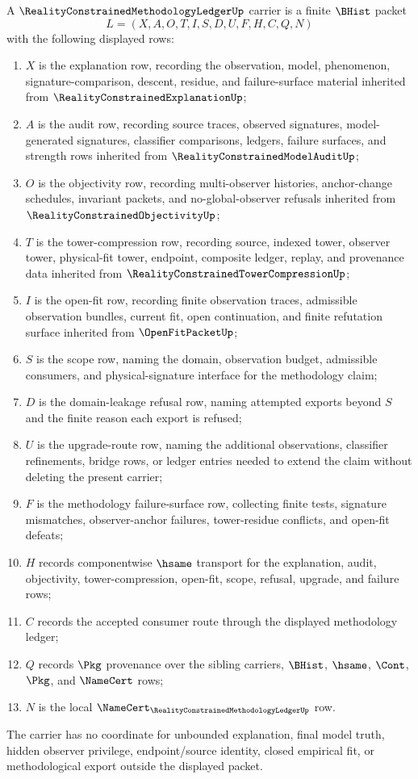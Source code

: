 \begin{definition}
\label{def:reality-constrained-methodology-ledger-carrier}
A $\RealityConstrainedMethodologyLedgerUp$ carrier is a finite $\BHist$ packet
$$
L=(X,A,O,T,I,S,D,U,F,H,C,Q,N)
$$
with the following displayed rows:
\begin{enumerate}
\item $X$ is the explanation row, recording the observation, model, phenomenon, signature-comparison, descent, residue, and failure-surface material inherited from $\RealityConstrainedExplanationUp$;
\item $A$ is the audit row, recording source traces, observed signatures, model-generated signatures, classifier comparisons, ledgers, failure surfaces, and strength rows inherited from $\RealityConstrainedModelAuditUp$;
\item $O$ is the objectivity row, recording multi-observer histories, anchor-change schedules, invariant packets, and no-global-observer refusals inherited from $\RealityConstrainedObjectivityUp$;
\item $T$ is the tower-compression row, recording source, indexed tower, observer tower, physical-fit tower, endpoint, composite ledger, replay, and provenance data inherited from $\RealityConstrainedTowerCompressionUp$;
\item $I$ is the open-fit row, recording finite observation traces, admissible observation bundles, current fit, open continuation, and finite refutation surface inherited from $\OpenFitPacketUp$;
\item $S$ is the scope row, naming the domain, observation budget, admissible consumers, and physical-signature interface for the methodology claim;
\item $D$ is the domain-leakage refusal row, naming attempted exports beyond $S$ and the finite reason each export is refused;
\item $U$ is the upgrade-route row, naming the additional observations, classifier refinements, bridge rows, or ledger entries needed to extend the claim without deleting the present carrier;
\item $F$ is the methodology failure-surface row, collecting finite tests, signature mismatches, observer-anchor failures, tower-residue conflicts, and open-fit defeats;
\item $H$ records componentwise $\hsame$ transport for the explanation, audit, objectivity, tower-compression, open-fit, scope, refusal, upgrade, and failure rows;
\item $C$ records the accepted consumer route through the displayed methodology ledger;
\item $Q$ records $\Pkg$ provenance over the sibling carriers, $\BHist$, $\hsame$, $\Cont$, $\Pkg$, and $\NameCert$ rows;
\item $N$ is the local $\NameCert_{\RealityConstrainedMethodologyLedgerUp}$ row.
\end{enumerate}
The carrier has no coordinate for unbounded explanation, final model truth, hidden observer privilege, endpoint/source identity, closed empirical fit, or methodological export outside the displayed packet.
\end{definition}
